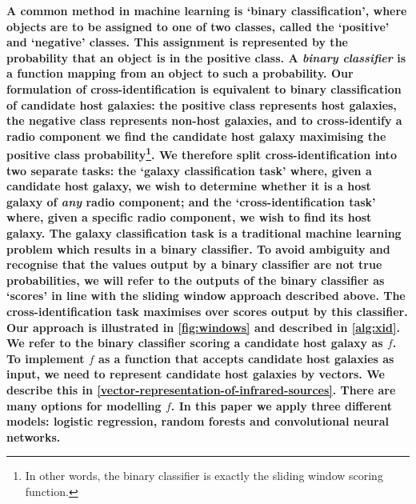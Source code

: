 \documentclass[fleqn,usenatbib,usedcolumn]{mnras}
\newcommand{\edited}[1]{{\bf {#1}}}
\begin{document}
    \edited{A common method in machine learning is `binary
    classification', where objects are to be assigned to one of two classes,
    called the `positive' and `negative' classes. This assignment is
    represented by the probability that an object is in the positive class. A
    \emph{binary classifier} is a function mapping from an object to such a
    probability. Our formulation of cross-identification is equivalent to
    binary classification of candidate host galaxies: the positive class
    represents host galaxies, the negative class represents non-host galaxies,
    and to cross-identify a radio component we find the candidate host galaxy
    maximising the positive class probability\footnote{In other words,
    the binary classifier is exactly the sliding window scoring function.}. We therefore split
    cross-identification into two separate tasks: the `galaxy
    classification task' where, given a candidate host galaxy, we wish to
    determine whether it is a host galaxy of \emph{any} radio component; and
    the `cross-identification task' where, given a specific radio
    component, we wish to find its host galaxy. The galaxy classification task
    is a traditional machine learning problem which results in a binary
    classifier. To avoid ambiguity and recognise that the values output by a
    binary classifier are not true probabilities, we will refer to the outputs
    of the binary classifier as `scores' in line with the sliding window approach
    described above. The cross-identification task maximises over scores
    output by this classifier. Our approach is illustrated in
    \autoref{fig:windows} and described in \autoref{alg:xid}. We refer to the
    binary classifier scoring a candidate host galaxy as
    $f$. To implement $f$ as a function that accepts candidate host galaxies
    as input, we need to represent candidate host galaxies by vectors. We
    describe this in \autoref{vector-representation-of-infrared-sources}.
    There are many options for modelling $f$. In this paper we apply three
    different models: logistic regression, random forests and convolutional
    neural networks.}
\end{document}
